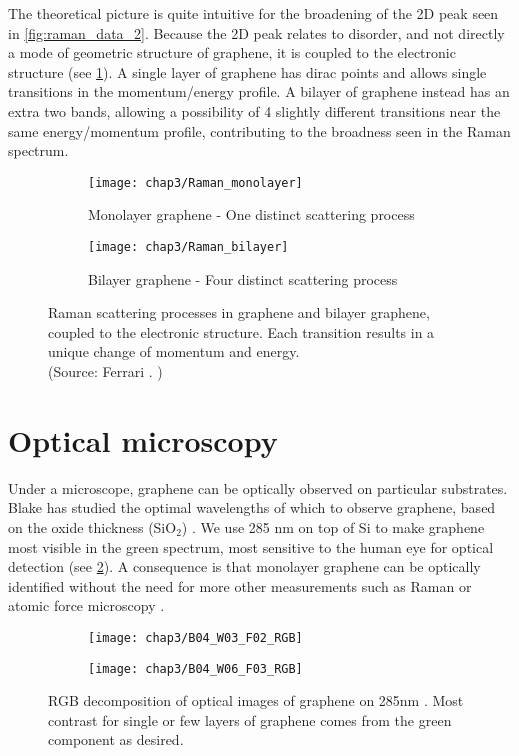 \documentclass[../Matt_Gebert_Honours_Thesis.tex]{subfiles}
\begin{document}
The theoretical picture is quite intuitive for the broadening of the 2D peak seen in \cref{fig:raman_data_2}. Because the 2D peak relates to disorder, and not directly a mode of geometric structure of graphene, it is coupled to the electronic structure (see \cref{fig:raman_graphene}). A single layer of graphene has dirac points and allows single transitions in the momentum/energy profile. A bilayer of graphene instead has an extra two bands, allowing a possibility of 4 slightly different transitions near the same energy/momentum profile, contributing to the broadness seen in the Raman spectrum.

\begin{figure}[H]
	\begin{subfigure}[t]{0.6\textwidth}
		\centering
		\texttt{[image: chap3/Raman\_monolayer]}
		\caption{Monolayer graphene - One distinct scattering process}
	\end{subfigure}
	\begin{subfigure}[t]{0.4\textwidth}
		\centering
		\texttt{[image: chap3/Raman\_bilayer]}
		\caption{Bilayer graphene - Four distinct scattering process}
	\end{subfigure}
	\caption[Raman processes in graphene]{Raman scattering processes in graphene and bilayer graphene, coupled to the electronic structure. Each transition results in a unique change of momentum and energy. \\(Source: Ferrari \etal. \cite{ferrari_raman_2006})}\label{fig:raman_graphene}
\end{figure}

\section{Optical microscopy}
Under a microscope, graphene can be optically observed on particular substrates. Blake  has studied the optimal wavelengths of which to observe graphene, based on the oxide thickness (SiO$_2$) \cite{blake_making_2007}. We use 285 nm \silicondioxide{} on top of Si to make graphene most visible in the green spectrum, most sensitive to the human eye for optical detection (see \cref{fig:rgb}). A consequence is that monolayer graphene can be optically identified without the need for more other measurements such as Raman or atomic force microscopy \cite{li_rapid_2013,wang_thickness_2012}. 

\begin{figure}
	\centering
	\begin{subfigure}{0.48\textwidth}
		\texttt{[image: chap3/B04\_W03\_F02\_RGB]}
	\end{subfigure}
	\begin{subfigure}{0.48\textwidth}
		\texttt{[image: chap3/B04\_W06\_F03\_RGB]}
	\end{subfigure}
	\caption[RGB images of graphene on 285nm \silicondioxide{}]{RGB decomposition of optical images of graphene on 285nm \silicondioxide{}. Most contrast for single or few layers of graphene comes from the green component as desired.}\label{fig:rgb}
\end{figure}
\end{document}

